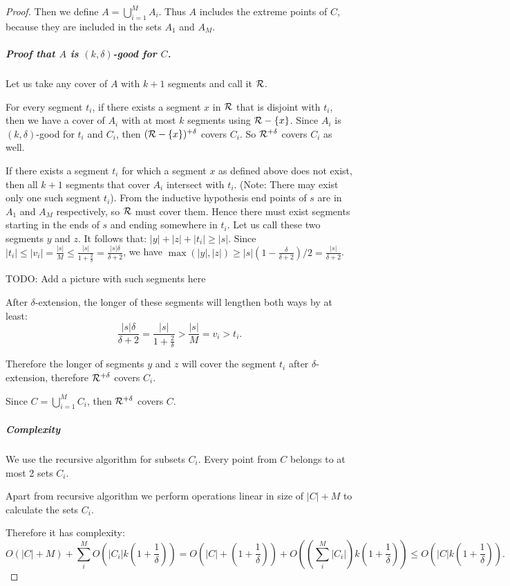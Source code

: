\begin{proof}
Then we define $A = \bigcup_{i=1}^{M} A_i$.
Thus $A$ includes the extreme points of $C$,
because they are included in the sets $A_1$ and $A_M$.

\subparagraph{Proof that $A$ is $(k, \delta)$-good for $C$.}
Let us take any cover of $A$ with $k+1$ segments and call it $\mathcal{R}$.

For every segment $t_i$, if there exists a segment $x$ in $\mathcal{R}$ 
that is disjoint with $t_i$,
then we have a cover of $A_i$ with at most $k$
segments using $\mathcal{R} - \{x\}$.
Since $A_i$ is $(k, \delta)$-good for $t_i$ and $C_i$,
then $(\mathcal{R} - \{x\})^{+\delta}$ covers $C_i$.
So $\mathcal{R}^{+\delta}$ covers $C_i$ as well.

If there exists a segment $t_i$ for which a segment $x$ as defined above
does not exist, then all $k+1$ segments that cover
$A_i$ intersect with $t_i$. (Note: There may exist only one such segment $t_i$).
From the inductive hypothesis end points of $s$ are
in $A_1$ and $A_M$ respectively, so $\mathcal{R}$ must cover them.
Hence there must exist
segments starting in the ends of $s$ and ending somewhere in $t_i$.
Let us call these two segments $y$ and $z$. It follows that:
$|y| + |z| + |t_i| \ge |s|$.
Since $|t_i| \le |v_i| = \frac{|s|}{M} \le \frac{|s|}{1+\frac{2}{\delta}} = \frac{|s|\delta}{\delta+2}$,
we have $\max(|y|, |z|) \ge |s|(1-\frac{\delta}{\delta+2})/2 = \frac{|s|}{\delta+2}$.

TODO: Add a picture with such segments here

After $\delta$-extension, the longer of these segments will
lengthen both ways by at least:
$$\frac{|s|\delta}{\delta+2} = \frac{|s|}{1+\frac{2}{\delta}} > \frac{|s|}{M} = v_i > t_i.$$

Therefore the longer of segments $y$ and $z$ will cover the segment $t_i$
after $\delta$-extension, therefore $\mathcal{R}^{+\delta}$ covers $C_i$.

Since $C = \bigcup_{i=1}^M C_i$,
then $\mathcal{R}^{+\delta}$ covers $C$.

\subparagraph{Complexity}

We use the recursive algorithm for subsets $C_i$. Every point
from $C$ belongs to at most 2 sets $C_i$.

Apart from recursive algorithm we perform operations linear in
size of $|C| + M$ to calculate the sets $C_i$.

Therefore it has complexity:
$$O(|C|+M) + \sum_i^M O(|C_i|k(1+\frac{1}{\delta})) = 
O(|C| + (1+\frac{1}{\delta})) + O((\sum_i^M |C_i|)k(1+\frac{1}{\delta})) \le O(|C|k(1+\frac{1}{\delta})).$$

\end{proof}


